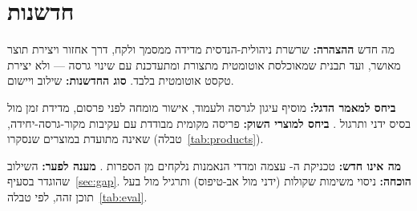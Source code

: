 \section{חדשנות}\label{sec:innovation}
\begin{pcbox}[pcGood]{מה חדש}
\textbf{ההצהרה:} שרשרת ניהולית-הנדסית מדידה ממסמך ולקח, דרך אחזור ויצירת תוצר מאושר, ועד תבנית \threeD{} שמאוכלסת אוטומטית מתצורת
 ומתעדכנת עם שינוי גרסה --- ולא יצירת טקסט אוטומטית בלבד. \textbf{סוג החדשנות:} שילוב ויישום.\par
\textbf{ביחס למאמר הדגל:} מוסיף עיגון לגרסה ולעמוד, אישור מומחה לפני פרסום, מדידת זמן מול בסיס ידני ותרגול 
\cite{hua2025civask}. \textbf{ביחס למוצרי השוק:} פריסה מקומית מבודדת עם עקיבות מקור-גרסה-יחידה, שאינה מתועדת במוצרים
שנסקרו (טבלה~\ref{tab:products}).\par
\textbf{מה אינו חדש:} טכניקת ה- עצמה ומדדי הנאמנות נלקחים מן הספרות \cite{lewis2020retrieval,es2024ragas}.
\textbf{מענה לפער:} השילוב שהוגדר בסעיף~\ref{sec:gap}.
\textbf{הוכחה:} ניסוי משימות שקולות (ידני מול אב-טיפוס) ותרגיל  מול  בעל תוכן זהה, לפי טבלה~\ref{tab:eval}.
\end{pcbox}

